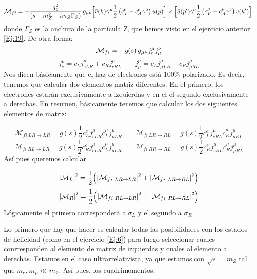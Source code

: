 \begin{equation} \small
\mathcal{M}_{fi} = -
\frac{g_Z^2}{(s - m_Z^2 + i m_Z \Gamma_Z)} \,
g_{\mu\nu}
\Bigl[
\bar{v}(k) \gamma^\mu \frac{1}{2}
\left( c_V^e - c_A^e \gamma^5 \right)
u(p)
\Bigr]
\times
\Bigl[
\bar{u}(p') \gamma^\nu \frac{1}{2}
\left( c_V^\mu - c_A^\mu \gamma^5 \right)
v(k')
\Bigr].
\end{equation}
donde $\Gamma_Z$ es la anchura de la partícula Z, que hemos visto en el ejercicio anterior \ref{Ej:19}. De otra forma: 
\begin{equation} \small
\mathcal{M}_{fi} = -
g(s) \,
g_{\mu\nu} j^\mu_e j^\nu_\mu 
\end{equation}
\begin{equation} 
	j^\mu_e = c_L j^\mu_{eLR} + c_R j^\mu_{eRL}  \qquad  j^\nu_\mu = c_L j^\mu_{\mu LR} + c_R j^\mu_{\mu RL}
\end{equation}
Nos dicen básicamente que el haz de electrones está 100\% polarizado. Es decir, tenemos que calcular dos elementos matriz diferentes. En el primero, los electrones estarán exclusivamente a izquierdas y en el el segundo exclusivamente a derechas. En resumen, básicamente tenemos que calcular los dos siguientes elementos de matriz: 

\begin{equation}
	\mathcal{M}_{fi \ LR \to LR} = g(s) \frac{1}{2} c_L^e j^\mu_{eLR} c_L^\mu j^\mu_{\mu LR}   \qquad 
	\mathcal{M}_{fi \ LR \to RL} = g(s) \frac{1}{2} c_L^e j^\mu_{eRL} c_R^\mu j^\mu_{\mu RL}  
\end{equation}
\begin{equation}
	\mathcal{M}_{fi \ RL \to LR} = g(s) \frac{1}{2} c_R^e j^\mu_{eLR}  c_L^\mu j^\mu_{\mu LR}  \qquad 
	\mathcal{M}_{fi \ RR \to RL} = g(s) \frac{1}{2} c_R^e j^\mu_{eRL}  c_R^\mu j^\mu_{\mu RL}  
\end{equation}
Así pues queremos calcular

\begin{equation}
	\vqty{\Mcal_{L}}^2 = \frac{1}{2} \pqty{\vqty{\mathcal{M}_{fi \ LR \to LR}}^2 + \vqty{\mathcal{M}_{fi \ LR \to RL}}^2}
\end{equation}
\begin{equation}
	\vqty{\Mcal_{R}}^2 = \frac{1}{2} \pqty{\vqty{\mathcal{M}_{fi \ RL \to LR}}^2 + \vqty{\mathcal{M}_{fi \ RL \to RL}}^2}
\end{equation}
Lógicamente el primero corresponderá a $\sigma_L$ y el segundo a $\sigma_R$.

Lo primero que hay que hacer es calcular todas las posibilidades con los estados de helicidad (como en el ejercicio \ref{Ej:6}) para luego seleccionar cuales conrresponden al elemento de matriz de izquierdas y cuales al elemento a derechas. Estamos en el caso ultrarrelativista, ya que estamos con $\sqrt{s}=m_Z$ tal que $m_e,m_\mu\ll m_Z$. Así pues, los cuadrimomentos:

